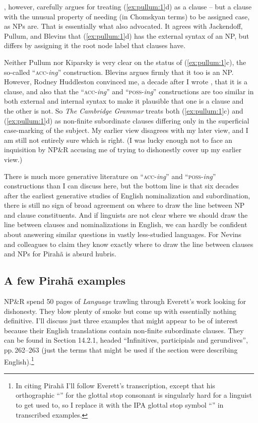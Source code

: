 \documentclass[output=paper,colorlinks,citecolor=brown
]{langscibook}
\begin{document}
\citet{Kiparsky17}, however, carefully argues for treating (\ref{ex:pullum:1}d) as
a clause -- but a clause with the unusual property of needing (in
Chomskyan terms) to be assigned case, as NPs are. That is essentially
what \citet{Stowell81} also advocated. It agrees with Jackendoff,
Pullum, and Blevins that (\ref{ex:pullum:1}d) has the external syntax of an NP, but
differs by assigning it the root node label that clauses have.

Neither Pullum nor Kiparsky is very clear on the status of (\ref{ex:pullum:1}c), the
so-called ``\textsc{acc}-\textit{ing}'' construction. Blevins argues
firmly that it too is an NP. However, Rodney Huddleston convinced me,
a decade after I wrote \citet{Pullum91}, that it is a clause, and also
that the ``\textsc{acc}-\textit{ing}'' and ``\textsc{poss}-\textit{ing}''
constructions are too similar in both external and internal syntax
to make it plausible that one is a clause and the other is not.
So \textit{The Cambridge Grammar} treats both (\ref{ex:pullum:1}c) and (\ref{ex:pullum:1}d) as
non-finite subordinate clauses differing only in the superficial
case-marking of the subject. My earlier view disagrees with my later
view, and I am still not entirely sure which is right. (I was
lucky enough not to face an inquisition by NP\&R accusing me of
trying to dishonestly cover up my earlier view.)

There is much more generative literature on ``\textsc{acc}-\textit{ing}''
and ``\textsc{poss}-\textit{ing}'' constructions than I can discuss here,
but the bottom line is that six decades after the earliest generative
studies of English nominalization and subordination, there is still
no sign of broad agreement on where to draw the line between NP and
clause constituents.  And if linguists are not clear where we should
draw the line between clauses and nominalizations in English, we can
hardly be confident about answering similar questions in vastly
less-studied languages. For Nevins and colleagues to claim they know
exactly where to draw the line between clauses and NPs for Pirahã
is absurd hubris.

\subsection{A few Pirahã examples}

NP\&R spend 50 pages of \textit{Language} trawling through Everett's
work looking for dishonesty. They blow plenty of smoke but come up
with essentially nothing definitive. I'll discuss just three examples
that might appear to be of interest because their English translations
contain non-finite subordinate clauses. They can be found in
\citet{Everett86HAL} Section 14.2.1, headed ``Infinitives, participials
and gerundives'', pp.\,262--263 (just the terms that might be used if
the section were describing English).\footnote{%
   In citing Pirahã I'll follow Everett's transcription, except
   that his orthographic ``'' for the glottal stop consonant is
   singularly hard for a linguist to get used to, so I replace it with the
   IPA glottal stop symbol ``{\textglotstop}'' in transcribed examples.}
\end{document}
